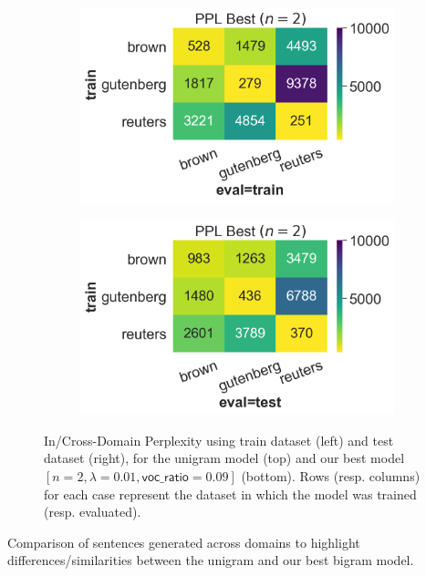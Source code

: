 \documentclass[11pt]{article}
\begin{document}
\begin{figure}
\begin{subfigure}{0.45\textwidth}
  \includegraphics[width=\textwidth]{figures/bigram_cross_ppl_train.png}
\end{subfigure}
\hspace{5pt}
\begin{subfigure}{0.45\textwidth}
  \includegraphics[width=\textwidth]{figures/bigram_cross_ppl_test.png}
\end{subfigure}
\caption{In/Cross-Domain Perplexity using train dataset (left) and test dataset (right), for the unigram model (top) and our best model $[n=2,\lambda=0.01,\textsf{voc\_ratio}=0.09]$ (bottom). Rows (resp. columns) for each case represent the dataset in which the model was trained (resp. evaluated).}
\label{fig:cross_ppl}
\end{figure}


\begin{table}
\centering

\caption{Comparison of sentences generated across domains to highlight differences/similarities between the unigram and our best bigram model.}\label{tbl:uniVsBi}
\end{table}
\end{document}
